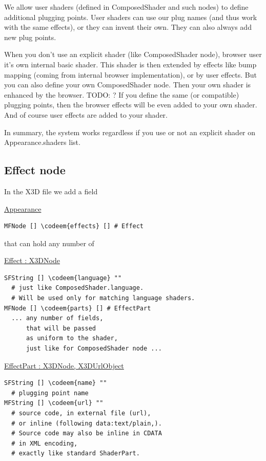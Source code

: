 \documentclass{acmsiggraph}                     %
\newenvironment{mycode}
{\begin{mycodecore}}
{\end{mycodecore}
\vspace{-0.1in}}
\newcommand*{\codeem}[1]{\textbf{#1}}
\begin{document}
We allow user shaders (defined in ComposedShader and such nodes) to
define additional plugging points. User shaders can use our plug names
(and thus work with the same effects), or they can invent their
own. They can also always add new plug points.

When you don't use an explicit shader (like ComposedShader node),
browser user it's own internal basic shader. This shader is then
extended by effects like bump mapping (coming from internal browser
implementation), or by user effects. But you can also define your own
ComposedShader node. Then your own shader is enhanced by the
browser. TODO: ? If you define the same (or compatible) plugging
points, then the browser effects will be even added to your own
shader. And of course user effects are added to your shader.

In summary, the system works regardless if you use or not an explicit
shader on Appearance.shaders list.

\subsection{Effect node}

In the X3D file we add a field

\begin{mycode}
\underline{Appearance}
\begin{Verbatim}[commandchars=\\\{\}]
MFNode [] \codeem{effects} [] # Effect
\end{Verbatim}
\end{mycode}

that can hold any number of

\begin{mycode}
\underline{Effect : X3DNode}
\begin{Verbatim}[commandchars=\\\{\}]
SFString [] \codeem{language} ""
  # just like ComposedShader.language.
  # Will be used only for matching language shaders.
MFNode [] \codeem{parts} [] # EffectPart
  ... any number of fields,
      that will be passed
      as uniform to the shader,
      just like for ComposedShader node ...
\end{Verbatim}
\end{mycode}

\begin{mycode}
\underline{EffectPart : X3DNode, X3DUrlObject}
\begin{Verbatim}[commandchars=\\\{\}]
SFString [] \codeem{name} ""
  # plugging point name
MFString [] \codeem{url} ""
  # source code, in external file (url),
  # or inline (following data:text/plain,).
  # Source code may also be inline in CDATA
  # in XML encoding,
  # exactly like standard ShaderPart.
\end{Verbatim}
\end{mycode}
\end{document}
